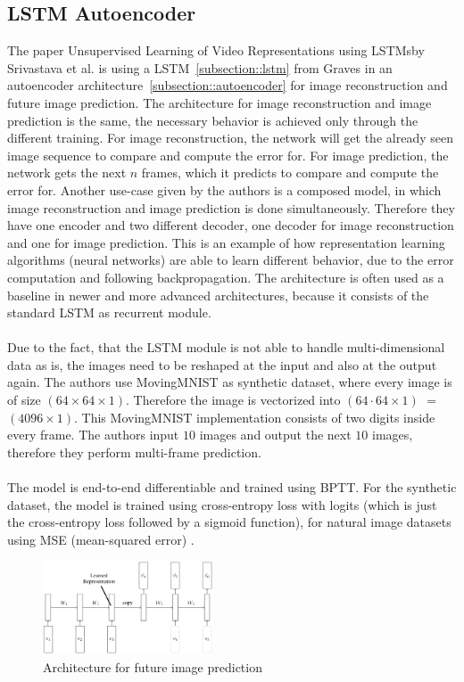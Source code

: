  \subsection{LSTM Autoencoder} \label{subsection::lstm_autoencoder}
  The paper \glqq Unsupervised Learning of Video Representations using LSTMs\grqq by Srivastava et al. \cite{Srivastava2015} is using a LSTM~\ref{subsection::lstm} from Graves 
  \cite{Graves2013} in an autoencoder architecture~\ref{subsection::autoencoder} for image reconstruction and future image prediction.
  The architecture for image reconstruction and image prediction is the same, the necessary behavior is achieved only through the different training.
  For image reconstruction, the network will get the already seen image sequence to compare and compute the error for. For image prediction, the network gets
  the next $n$ frames, which it predicts to compare and compute the error for.
  Another use-case given by the authors is a composed model, in which image reconstruction and image prediction is done simultaneously. Therefore they have
  one encoder and two different decoder, one decoder for image reconstruction and one for image prediction.
  This is an example of how representation learning algorithms (neural networks) are able to learn different behavior, due to the error computation and following
  backpropagation.
  The architecture is often used as a baseline in newer and more advanced architectures, because it consists of the standard LSTM as recurrent module.
  \\\\
  Due to the fact, that the LSTM module is not able to handle multi-dimensional data as is, the images need to be reshaped at the input and also at the output again. The authors use
  MovingMNIST \cite{LeCun1998} as synthetic dataset, where every image is of size $(64 \times 64 \times 1)$. Therefore the image is vectorized into $(64 \cdot 64 \times 1)$ $=$ $(4096 \times 1)$.
  This MovingMNIST implementation consists of two digits inside every frame. The authors input $10$ images and output the next $10$ images, therefore they perform 
  multi-frame prediction.
  \\\\
  The model is end-to-end differentiable and trained using BPTT.
  For the synthetic dataset, the model is trained using cross-entropy loss with logits (which is just the cross-entropy loss followed by a sigmoid function), for 
  natural image datasets using MSE (mean-squared error) \cite{Zhao2017}.
  \begin{figure}[H]
   \includegraphics[width=0.45\textwidth]{../Images/srivastava.png}
   \centering
   \caption{Architecture for future image prediction \cite{Srivastava2015}}
   \label{fig:lstm_architecture}
  \end{figure}
